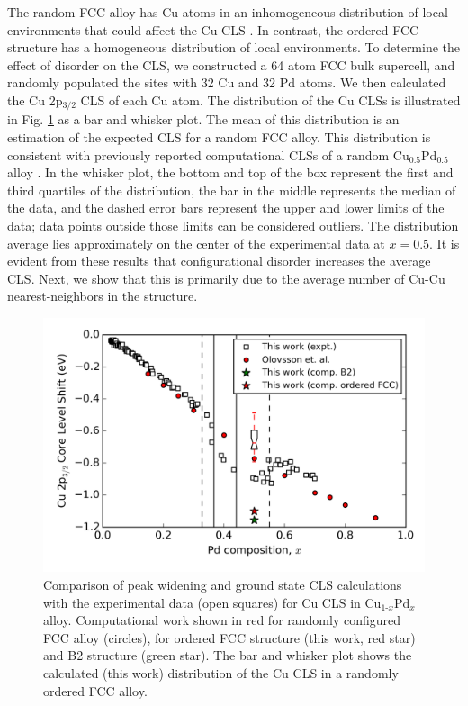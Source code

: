\documentclass[number, sort&compress, review, 12pt]{elsarticle}
\begin{document}
The random FCC alloy has Cu atoms in an inhomogeneous distribution of local environments that could affect the Cu CLS \cite{marten-2005-ab-initio}. In contrast, the ordered FCC structure has a homogeneous distribution of local environments. To determine the effect of disorder on the CLS, we constructed a 64 atom FCC bulk supercell, and randomly populated the sites with 32 Cu and 32 Pd atoms. We then calculated the Cu 2p$_{\text{3/2}}$ CLS of each Cu atom. The distribution of the Cu CLSs is illustrated in Fig. \ref{fig-result} as a bar and whisker plot. The mean of this distribution is an estimation of the expected CLS for a random FCC alloy. This distribution is consistent with previously reported computational CLSs of a random Cu$_{\text{0.5}}$Pd$_{\text{0.5}}$ alloy \cite{olovsson-2006-core-level}. In the whisker plot, the bottom and top of the box represent the first and third quartiles of the distribution, the bar in the middle represents the median of the data, and the dashed error bars represent the upper and lower limits of the data; data points outside those limits can be considered outliers. The distribution average lies approximately on the center of the experimental data at $x = 0.5$. It is evident from these results that configurational disorder increases the average CLS. Next, we show that this is primarily due to the average number of Cu-Cu nearest-neighbors in the structure.

\begin{figure}[H]
\centering
\includegraphics[width=6in]{./images/result.png}
\caption{\label{fig-result}Comparison of peak widening and ground state CLS calculations with the experimental data (open squares) for Cu CLS in Cu$_{\text{1-}x}$Pd$_x$ alloy. Computational work \cite{olovsson-2002-core-level} shown in red for randomly configured FCC alloy (circles), for ordered FCC structure (this work, red star) and B2 structure (green star). The bar and whisker plot shows the calculated (this work) distribution of the Cu CLS in a randomly ordered FCC alloy.}
\end{figure}
\end{document}
